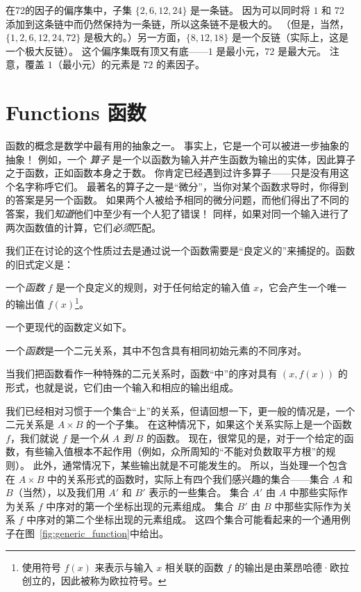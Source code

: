 在72的因子的偏序集中，子集 $\{2, 6, 12, 24\}$ 是一条链。
因为可以同时将 $1$ 和 $72$ 添加到这条链中而仍然保持为一条链，所以这条链不是极大的。
（但是，当然，$\{1, 2, 6, 12, 24, 72\}$ 是极大的。）另一方面，$\{8, 12, 18\}$ 是一个反链（实际上，这是一个极大反链）。
这个偏序集既有顶又有底——$1$ 是最小元，$72$ 是最大元。
注意，覆盖 $1$（最小元）的元素是 $72$ 的素因子。

\newpage




\newpage

\section{Functions 函数}
\label{sec:functions}

函数的概念是数学中最有用的抽象之一。
事实上，它是一个可以被进一步抽象的抽象！
例如，一个 \emph{算子} 是一个以函数为输入并产生函数为输出的实体，因此算子之于函数，正如函数本身之于数。
你肯定已经遇到过许多算子——只是没有用这个名字称呼它们。
最著名的算子之一是“微分”，当你对某个函数求导时，你得到的答案是另一个函数。
如果两个人被给予相同的微分问题，而他们得出了不同的答案，我们\emph{知道}他们中至少有一个人犯了错误！
同样，如果对同一个输入进行了两次函数值的计算，它们\emph{必须}匹配。

我们正在讨论的这个性质过去是通过说一个函数需要是“良定义的”来捕捉的。函数的旧式定义是：

\begin{defi}
一个\emph{函数} $f$ 是一个良定义的规则，对于任何给定的输入值 $x$，它会产生一个唯一的输出值 $f(x)$\footnote{使用符号 $f(x)$ 来表示与输入 $x$ 相关联的函数 $f$ 的输出是由莱昂哈德·欧拉创立的，因此被称为欧拉符号。}。
\end{defi}

一个更现代的函数定义如下。

\begin{defi}
一个\emph{函数}是一个二元关系，其中不包含具有相同初始元素的不同序对。
\end{defi}

当我们把函数看作一种特殊的二元关系时，函数“中”的序对具有 $(x, f(x))$ 的形式，也就是说，它们由一个输入和相应的输出组成。

我们已经相对习惯于一个集合“上”的关系，但请回想一下，更一般的情况是，一个二元关系是 $A \times B$ 的一个子集。
在这种情况下，如果这个关系实际上是一个函数 $f$，我们就说 $f$ 是一个\emph{从} $A$ \emph{到} $B$ 的函数。
现在，很常见的是，对于一个给定的函数，有些输入值根本不起作用（例如，众所周知的“不能对负数取平方根”的规则）。
此外，通常情况下，某些输出就是不可能发生的。
所以，当处理一个包含在 $A \times B$ 中的关系形式的函数时，实际上有四个我们感兴趣的集合——集合 $A$ 和 $B$（当然），以及我们用 $A'$ 和 $B'$ 表示的一些集合。
集合 $A'$ 由 $A$ 中那些实际作为关系 $f$ 中序对的第一个坐标出现的元素组成。
集合 $B'$ 由 $B$ 中那些实际作为关系 $f$ 中序对的第二个坐标出现的元素组成。
这四个集合可能看起来的一个通用例子在图~\ref{fig:generic_function}中给出。

